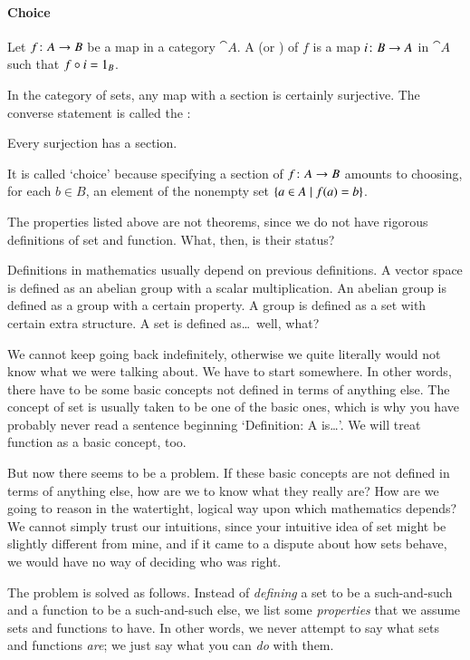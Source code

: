 \paragraph*{Choice}  Let $f\from A \to B$ be a map in a category $\cat{A}$.  A
%
%
%
(or ) of $f$ is a map $i\from B \to A$ in $\cat{A}$ such that $f \mathbin{\circ} i
= 1_B$.

In the category of sets, any map with a section is certainly surjective.  The
converse statement is called the :
% 
\begin{setprop}
Every surjection has a section.
\end{setprop}
% 
It is called `choice' because specifying a section of $f\from A \to B$ amounts
to choosing, for each $b \in B$, an element of the nonempty set $\{ a \in A
\mathrel{|} f(a) = b\}$.

\subjectchange

%
%
%
%
The properties listed above are not theorems, since we do not have rigorous
definitions of set and function.  What, then, is their status?

Definitions in mathematics usually depend on previous definitions.  A
vector space is defined as an abelian group with a scalar multiplication.
An abelian group is defined as a group with a certain property.  A group is
defined as a set with certain extra structure.  A set is defined as\ldots\
well, what?

We cannot keep going back indefinitely, otherwise we quite literally would not
know what we were talking about.  We have to start somewhere.  In other words,
there have to be some basic concepts not defined in terms of anything else.
The concept of set is usually taken to be one of the basic ones, which is
why you have probably never read a sentence beginning `Definition: A 
is\ldots'.  We will treat function as a basic concept, too.

But now there seems to be a problem.  If these basic concepts are not
defined in terms of anything else, how are we to know what they really are?
How are we going to reason in the watertight, logical way upon which
mathematics depends?  We cannot simply trust our intuitions, since your
intuitive idea of set might be slightly different from mine, and if it came
to a dispute about how sets behave, we would have no way of deciding who
was right.

The problem is solved as follows.  Instead of \emph{defining} a set to be a
such-and-such and a function to be a such-and-such else, we list some
\emph{properties} that we assume sets and functions to have.  In other words,
we never attempt to say what sets and functions \emph{are}; we just say what
you can \emph{do} with them.

